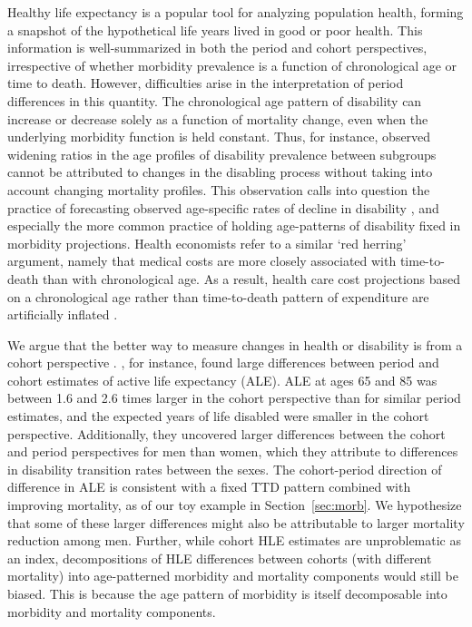 \documentclass[11pt,oneside,a4paper]{article} %
\begin{document}
Healthy life expectancy is a popular tool for analyzing population health, forming a snapshot of the hypothetical life years lived in good or poor health. This information is well-summarized in both the period and
cohort perspectives, irrespective of whether morbidity prevalence is a function of
chronological age or time to death. However, difficulties arise in the
interpretation of period differences in this quantity. The chronological age
pattern of disability can increase or decrease solely as a function of mortality
change, even when the underlying morbidity function is held constant. Thus, for
instance, observed widening ratios in the age profiles of disability prevalence
between subgroups \citep{Crimmins2001} cannot be attributed to changes in the
disabling process without taking into account changing mortality profiles. This
observation calls into question the practice of forecasting observed
age-specific rates of decline in disability \citep{Manton2006,Khaw1999}, and
especially the more common practice of holding age-patterns of disability fixed
in morbidity projections.
Health economists refer to a similar `red herring' argument, namely that medical costs are more closely associated with time-to-death than with chronological age. As a result, health
care cost projections based on a chronological age rather than time-to-death
pattern of expenditure are artificially inflated \citep{Zweifel1999,Geue2014}.

We argue that the better way to measure changes in health or disability
is from a cohort perspective \citep{Manton2000,Manton2008,Christensen2013}.
\citet{Manton2000}, for instance, found large differences between period and
cohort estimates of active life expectancy (ALE). ALE at ages 65 and 85 was
between 1.6 and 2.6 times larger in the cohort perspective than for similar
period estimates, and the expected years of life disabled were smaller in the
cohort perspective.
Additionally, they uncovered larger differences between the cohort and period
perspectives for men than women, which they attribute to differences in
disability transition rates between the sexes. The cohort-period direction of difference in ALE is consistent with a fixed TTD pattern combined with improving mortality, as of our toy example in Section~\ref{sec:morb}. We hypothesize that some of these
larger differences might also be attributable to larger mortality reduction
among men. Further, while cohort HLE estimates are unproblematic as an index,
decompositions of HLE differences between cohorts (with different mortality) into age-patterned morbidity and
mortality components would still be biased. This is because the age pattern of
morbidity is itself decomposable into morbidity and
mortality components.  
\end{document}
